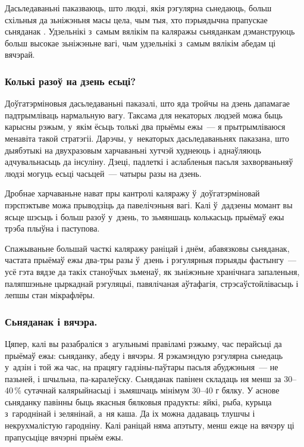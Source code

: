 Дасьледаваньні паказваюць, што людзі, якія рэгулярна сьнедаюць, больш схільныя да зьніжэньня масы цела, чым тыя, хто пэрыядычна прапускае сьняданак . Удзельнікі з~самым вялікім па каляражы сьняданкам дэманструюць больш высокае зьніжэньне вагі, чым удзельнікі з~самым вялікім абедам ці вячэрай.

\subsubsection{Колькі разоў на дзень есьці?}
Доўгатэрміновыя дасьледаваньні паказалі, што яда тройчы на дзень дапамагае падтрымліваць нармальную вагу. Таксама для некаторых людзей можа быць карысны рэжым, у~якім ёсьць толькі два прыёмы ежы~--- я прытрымліваюся менавіта такой стратэгіі. Дарэчы, у~некаторых дасьледаваньнях паказана, што дыябэтыкі на двухразовым харчаваньні хутчэй худнеюць і аднаўляюць адчувальнасьць да інсуліну. Дзеці, падлеткі і аслабленыя пасьля захворваньняў людзі могуць есьці часьцей~--- чатыры разы на дзень.

Дробнае харчаваньне нават пры кантролі каляражу ў~доўгатэрміновай пэрспэктыве можа прыводзіць да павелічэньня вагі. Калі ў~дадзены момант вы ясьце шэсьць і больш разоў у~дзень, то зьмяншаць колькасьць прыёмаў ежы трэба плыўна і паступова.

Спажываньне большай часткі каляражу раніцай і днём, абавязковы сьняданак, частата прыёмаў ежы два-тры разы ў~дзень і рэгулярныя пэрыяды фастынгу~--- усё гэта вядзе да такіх станоўчых зьменаў, як зьніжэньне хранічнага запаленьня, паляпшэньне цыркаднай рэгуляцыі, павялічаная аўтафагія, стрэсаўстойлівасьць і лепшы стан мікрафлёры.

\subsubsection{Сьняданак і вячэра.}
Цяпер, калі вы разабраліся з~агульнымі правіламі рэжыму, час перайсьці да прыёмаў ежы: сьняданку, абеду і вячэры. Я рэкамэндую рэгулярна сьнедаць у~адзін і той жа час, на працягу гадзіны-паўтары пасьля абуджэньня~--- не пазьней, і шчыльна, па-каралеўску. Сьняданак павінен складаць ня менш за 30--40\,\% сутачнай калярыйнасьці і зьмяшчаць мінімум 30--40 г бялку. У аснове сьняданку павінны быць якасныя бялковыя прадукты: яйкі, рыба, курыца з~гароднінай і зелянінай, а~ня каша. Да іх можна дадаваць тлушчы і некрухмалістую гародніну. Калі раніцай няма апэтыту, менш ежце на вячэру ці прапусьціце вячэрні прыём ежы.

